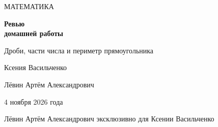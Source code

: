 \documentclass[a4paper,11pt]{article}
\begin{document}
\thispagestyle{empty}
\vspace*{39mm}
\begin{center}
{\small\color{accent}МАТЕМАТИКА}\par
\vspace{12mm}
{\Huge\bfseries Ревью\\ домашней работы}\par
\vspace{9mm}
{\large Дроби, части числа и периметр прямоугольника}\par
\vspace{19mm}
{\Large Ксения Васильченко}\par
\vspace{18mm}
{\normalsize Лёвин Артём Александрович}\par
\vspace{3mm}
{\normalsize 4 ноября 2026 года}\par
\end{center}
\vfill
\begin{center}
{\small\color{quiet}Лёвин Артём Александрович эксклюзивно для Ксении Васильченко}\par
\vspace{8mm}
\end{center}
\newpage
\end{document}
